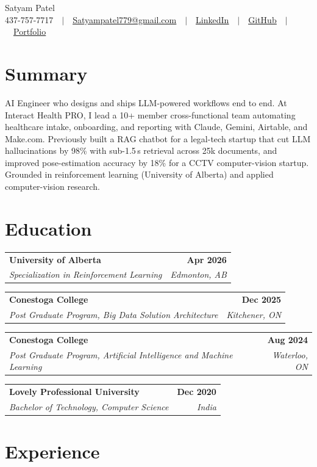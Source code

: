 \documentclass[letterpaper,10pt]{article}
\makeatletter
\newcommand{\edu}[4]{%
  \begin{tabularx}{\textwidth}{@{}X r@{}}
    \textbf{#1} & \textbf{#2}\\
    \textit{#3} & \textit{#4}\\
  \end{tabularx}\vspace{1pt}}
\makeatother
\begin{document}
\begin{center}
  {\fontsize{24}{26}\selectfont Satyam Patel}\\[3pt]
  \small
  437-757-7717\ \ $|$\ \
  \href{mailto:Satyampatel779@gmail.com}{\underline{Satyampatel779@gmail.com}}\ \ $|$\ \
  \href{https://www.linkedin.com/in/satyampatel779/}{\underline{LinkedIn}}\ \ $|$\ \
  \href{https://github.com/Satyampatel779}{\underline{GitHub}}\ \ $|$\ \
  \href{https://satyampatel779.github.io/PortFolio/}{\underline{Portfolio}}
\end{center}
\vspace{-6pt}

\section{Summary}
AI Engineer who designs and ships LLM-powered workflows end to end. At Interact Health PRO, I lead a 10+ member
cross-functional team automating healthcare intake, onboarding, and reporting with Claude, Gemini, Airtable, and
Make.com. Previously built a RAG chatbot for a legal-tech startup that cut LLM hallucinations by 98\% with
sub-1.5\,s retrieval across 25k documents, and improved pose-estimation accuracy by 18\% for a CCTV computer-vision
startup. Grounded in reinforcement learning (University of Alberta) and applied computer-vision research.

\section{Education}
\edu{University of Alberta}{Apr 2026}{Specialization in Reinforcement Learning}{Edmonton, AB}
\edu{Conestoga College}{Dec 2025}{Post Graduate Program, Big Data Solution Architecture}{Kitchener, ON}
\edu{Conestoga College}{Aug 2024}{Post Graduate Program, Artificial Intelligence and Machine Learning}{Waterloo, ON}
\edu{Lovely Professional University}{Dec 2020}{Bachelor of Technology, Computer Science}{India}

\section{Experience}
\end{document}
